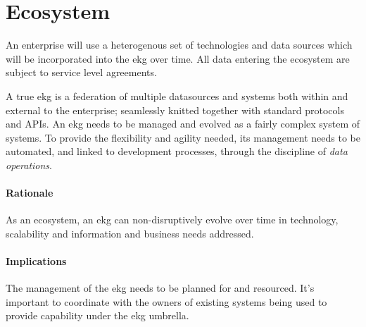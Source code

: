 \section{Ecosystem}\label{sec:ekg-principle-ecosystem}

An enterprise will use a heterogenous set of technologies and data sources which
will be incorporated into the \gls{ekg} over time. 
All data entering the ecosystem are subject to service level agreements.

A true \gls{ekg} is a federation of multiple datasources and systems 
both within and external to the enterprise; seamlessly knitted together with standard protocols and APIs.
An \gls{ekg} needs to be managed and evolved as a fairly complex system of systems. 
To provide the flexibility and agility needed, its management needs to be automated, 
and linked to development processes, through the discipline of \textit{data operations}.

\paragraph{Rationale}

As an ecosystem, an \gls{ekg} can non-disruptively evolve over time in technology, 
scalability and information and business needs addressed.

\paragraph{Implications}

The management of the \gls{ekg} needs to be planned for and resourced.
It's important to coordinate with the owners of existing systems being used 
to provide capability under the \gls{ekg} umbrella.
